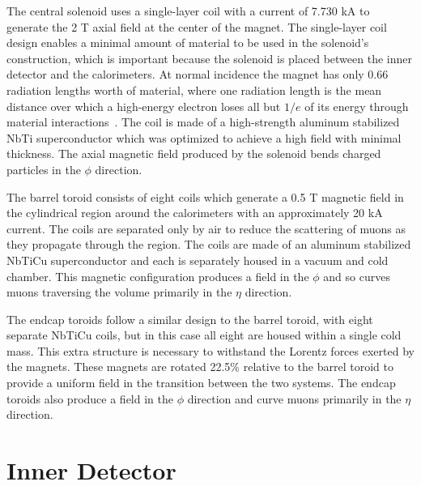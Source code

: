 The central solenoid uses a single-layer coil with a current of 7.730 kA to generate the 2 T axial field at the center of the magnet. 
The single-layer coil design enables a minimal amount of material to be used in the solenoid's construction, which is important because the solenoid is placed between the inner detector and the calorimeters.
At normal incidence the magnet has only 0.66 radiation lengths worth of material, where one radiation length is the mean distance over which a high-energy electron loses all but $1/e$ of its energy through material interactions~\cite{pdg}.
The coil is made of a high-strength aluminum stabilized NbTi superconductor which was optimized to achieve a high field with minimal thickness.
The axial magnetic field produced by the solenoid bends charged particles in the $\phi$ direction.

The barrel toroid consists of eight coils which generate a 0.5 T magnetic field in the cylindrical region around the calorimeters with an approximately 20 kA current.
The coils are separated only by air to reduce the scattering of muons as they propagate through the region.
The coils are made of an aluminum stabilized NbTiCu superconductor and each is separately housed in a vacuum and cold chamber.
This magnetic configuration produces a field in the $\phi$ and so curves muons traversing the volume primarily in the $\eta$ direction.

The endcap toroids follow a similar design to the barrel toroid, with eight separate NbTiCu coils, but in this case all eight are housed within a single cold mass.
This extra structure is necessary to withstand the Lorentz forces exerted by the magnets. 
These magnets are rotated 22.5\% relative to the barrel toroid to provide a uniform field in the transition between the two systems. 
The endcap toroids also produce a field in the $\phi$ direction and curve muons primarily in the $\eta$ direction.


\section{Inner Detector}
\label{sec:inner_detector}

